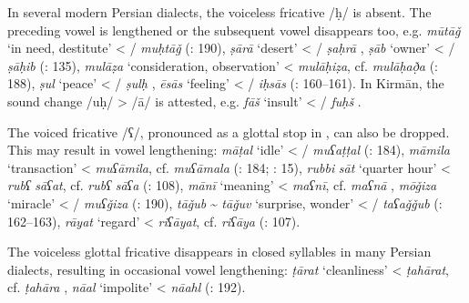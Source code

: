 \documentclass[output=paper]{langsci/langscibook}
\begin{document}

In several modern Persian dialects, the voiceless  fricative /ḥ/ is absent. The preceding vowel is lengthened or the subsequent vowel disappears too, e.g. \textit{mūtāǧ} ‘in need, destitute’ < / \textit{muḥtāǧ} (\citealt{Īzadpanāh2001}: 190), \textit{ṣārā} ‘desert’ < / \textit{ṣaḥrā} \citep[15]{Sarlak2002}, \textit{ṣāb} ‘owner’ < / \textit{ṣāḥib} (\citealt{Ṣarrāfī1996}: 135), \textit{mulāẓa} ‘consideration, observation’ <  \textit{mulāḥiẓa}, cf.  \textit{mulāḥað̣a} (\citealt{Ṣarrāfī1996}: 188), \textit{ṣul} ‘peace’ < / \textit{ṣulḥ} \citep{Stilo2001}, \textit{ēsās} ‘feeling’ < / \textit{iḥsās} (\citealt{Salāmī2004}: 160–161). In Kirmān, the sound change /uḥ/ > /ā/ is attested, e.g. \textit{fāš} ‘insult’ < / \textit{fuḥš} \citep{Borjian2017}.

    The voiced  fricative /ʕ/, pronounced as a glottal stop in , can also be dropped. This may result in vowel lengthening: \textit{māṭal} ‘idle’ < / \textit{muʕaṭṭal} (\citealt{Ṣarrāfī1996}: 184), \textit{māmila} ‘transaction’ <  \textit{muʕāmila}, cf.  \textit{muʕāmala} (\citealt{Ṣarrāfī1996}: 184; \citealt{Sarlak2002}: 15), \textit{rubbi} \textit{sāt} ‘quarter hour’ <  \textit{rubʕ} \textit{sāʕat}, cf.  \textit{rubʕ} \textit{sāʕa} (\citealt{Ṣarrāfī1996}: 108), \textit{mānī} ‘meaning’ <  \textit{maʕnī}, cf.  \textit{maʕnā} \citep[15]{Sarlak2002}, \textit{mōǧiza} ‘miracle’ < / \textit{muʕǧiza} (\citealt{Īzadpanāh2001}: 190), \textit{tāǧub} \~{} \textit{tāǧuv} ‘surprise, wonder’ < / \textit{taʕaǧǧub} (\citealt{Salāmī2004}: 162–163), \textit{rāyat} ‘regard’ <  \textit{riʕāyat}, cf.  \textit{riʕāya} (\citealt{Ṣarrāfī1996}: 107).


The voiceless glottal fricative disappears in closed syllables in many Persian dialects, resulting in occasional vowel lengthening: \textit{ṭārat} ‘cleanliness’ <  \textit{ṭahārat}, cf.  \textit{ṭahāra} \citep[76]{Sarlak2002}, \textit{nāal} ‘impolite’ <  \textit{nāahl} (\citealt{Īzadpanāh2001}: 192).

\end{document}
